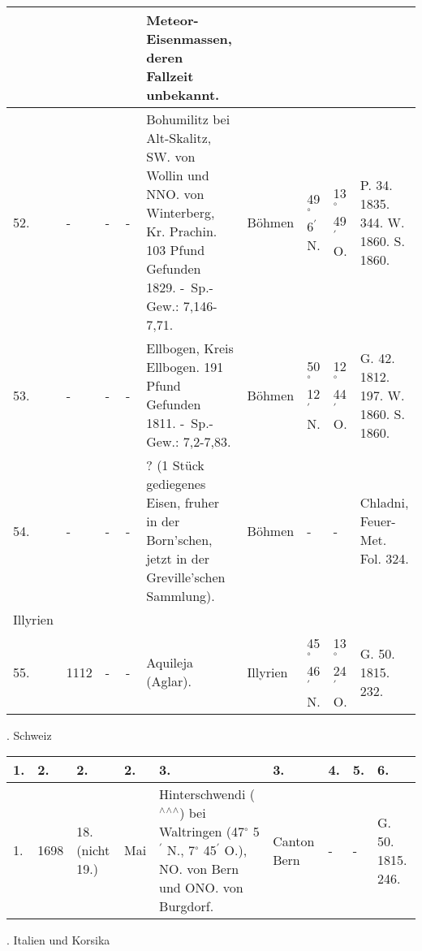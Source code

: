 \documentclass[a4paper, 11pt, oneside, polutonikogreek, german]{article}
\begin{document}
\begin{table}[!ht]
\begin{tabular}{|l|l|l|l|l|l|l|l|l|}
          &   &   &   & Meteor-Eisenmassen, deren Fallzeit unbekannt. &   &   &   & ~ \\ \hline
        52. & - & - & - & Bohumilitz bei Alt-Skalitz, SW. von Wollin und NNO. von Winterberg, Kr. Prachin. 103 Pfund Gefunden 1829. - Sp.-Gew.: 7,146-7,71. & Böhmen & 49$^\circ$ 6$^\prime$ N. & 13$^\circ$ 49$^\prime$ O. & P. 34. 1835. 344. W. 1860. S. 1860. \\ \hline
        53. & - & - & - & Ellbogen, Kreis Ellbogen. 191 Pfund Gefunden 1811. - Sp.-Gew.: 7,2-7,83. & Böhmen & 50$^\circ$ 12$^\prime$ N. & 12$^\circ$ 44$^\prime$ O. & G. 42. 1812. 197. W. 1860. S. 1860. \\ \hline
        54. & - & - & - & ? (1 Stück gediegenes Eisen, fruher in der Born’schen, jetzt in der Greville’schen Sammlung). & Böhmen & - & - & Chladni, Feuer-Met. Fol. 324. \\ \hline
        Illyrien &   &   &   &   &   &   &   &   \\ \hline
        55. & 1112 & - & - & Aquileja (Aglar). & Illyrien & 45$^\circ$ 46$^\prime$ N. & 13$^\circ$ 24$^\prime$ O. & G. 50. 1815. 232. \\ \hline
    \end{tabular}
\end{table}
. Schweiz
\begin{table}[!ht]
    \centering
    \begin{tabular}{|l|l|l|l|l|l|l|l|l|}
    \hline
        1. & 2. & 2. & 2. & 3. & 3. & 4. & 5. & 6. \\ \hline
        1. & 1698 & 18. (nicht 19.) & Mai & Hinterschwendi ($^\wedge$$^\wedge$$^\wedge$) bei Waltringen (47$^\circ$ 5$^\prime$ N., 7$^\circ$ 45$^\prime$ O.), NO. von Bern und ONO. von Burgdorf. & Canton Bern & - & - & G. 50. 1815. 246. \\ \hline
    \end{tabular}
\end{table}
. Italien und Korsika
\end{document}
